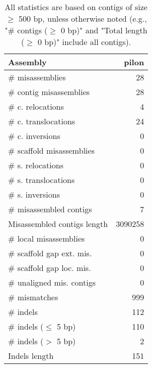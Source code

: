 \documentclass[12pt,a4paper]{article}
\begin{document}
\begin{table}[ht]
\begin{center}
\caption{All statistics are based on contigs of size $\geq$ 500 bp, unless otherwise noted (e.g., "\# contigs ($\geq$ 0 bp)" and "Total length ($\geq$ 0 bp)" include all contigs).}
\begin{tabular}{|l*{1}{|r}|}
\hline
Assembly & pilon \\ \hline
\# misassemblies & 28 \\ \hline
\hspace{2mm}\# contig misassemblies & 28 \\ \hline
\hspace{5mm}\# c. relocations & 4 \\ \hline
\hspace{5mm}\# c. translocations & 24 \\ \hline
\hspace{5mm}\# c. inversions & 0 \\ \hline
\hspace{2mm}\# scaffold misassemblies & 0 \\ \hline
\hspace{5mm}\# s. relocations & 0 \\ \hline
\hspace{5mm}\# s. translocations & 0 \\ \hline
\hspace{5mm}\# s. inversions & 0 \\ \hline
\# misassembled contigs & 7 \\ \hline
Misassembled contigs length & 3090258 \\ \hline
\# local misassemblies & 0 \\ \hline
\# scaffold gap ext. mis. & 0 \\ \hline
\# scaffold gap loc. mis. & 0 \\ \hline
\# unaligned mis. contigs & 0 \\ \hline
\# mismatches & 999 \\ \hline
\# indels & 112 \\ \hline
\hspace{5mm}\# indels ($\leq$ 5 bp) & 110 \\ \hline
\hspace{5mm}\# indels ($>$ 5 bp) & 2 \\ \hline
Indels length & 151 \\ \hline
\end{tabular}
\end{center}
\end{table}
\end{document}
